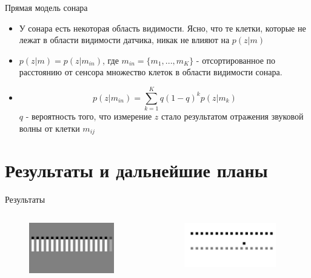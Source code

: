 \documentclass[9pt]{beamer}
\begin{document}
\begin{frame}{Прямая модель сонара}
\begin{itemize}
  \item
  {
    У сонара есть некоторая область видимости. Ясно, что те клетки, которые не лежат в области видимости датчика, никак не влияют на $p(z|m)$
  }
  \item
  {
    $p(z|m) = p(z|m_{in})$, где $m_{in} = \{ m_1, ..., m_K\}$ - отсортированное по расстоянию от сенсора множество клеток в области видимости сонара.
  }
  \item
  {
    $$p(z|m_{in}) = \sum_{k=1}^K{q (1-q)^k p(z|m_{k})}$$
    $q$ - вероятность того, что измерение $z$ стало результатом отражения звуковой волны от клетки $m_{ij}$
  }
\end{itemize}
\end{frame}



\section{Результаты и дальнейшие планы}
\begin{frame}{Результаты}
\begin{columns}
\begin{column}{0.5\textwidth}
  
  \begin{figure}[h]
    \centering
    \includegraphics[width=0.9\textwidth]{inv_line_ex.png}
  \end{figure}

\end{column}
\begin{column}{0.5\textwidth}
  \begin{figure}[h]
    \centering
    \includegraphics[width=0.9\textwidth]{line_ex.png}
  \end{figure}
\end{column}
\end{columns}
\end{frame}
\end{document}
